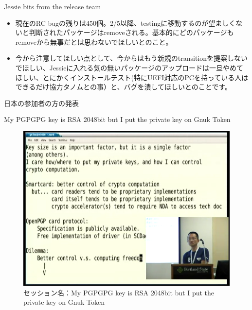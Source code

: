 \begin{frame}{Jessie bits from the release team}

\begin{itemize}
  \item 現在のRC bugの残りは450個。2/5以降、testingに移動するのが望ましくないと判断されたパッケージはremoveされる。基本的にどのパッケージもremoveから無事だとは思わないでほしいとのこと。
  \item 今から注意してほしい点として、今からはもう新規のtransitionを提案しないでほしい、Jessieに入れる気の無いパッケージのアップロードは一旦やめてほしい、とにかくインストールテスト(特にUEFI対応のPCを持っている人はできるだけ協力タノムとの事）と、バグを潰してほしいとのことです。
\end{itemize}

\end{frame}

\begin{frame}{日本の参加者の方の発表}


\end{frame}

\begin{frame}{My PGPGPG key is RSA 2048bit but I put the private key on Gnuk Token}

\begin{figure}[H]
\begin{center}
 \includegraphics[width=0.6\hsize]{image201409/gnuk.png}
\end{center}
\caption{セッション名：My PGPGPG key is RSA 2048bit but I put the private key on Gnuk Token}
\end{figure}

\end{frame}

